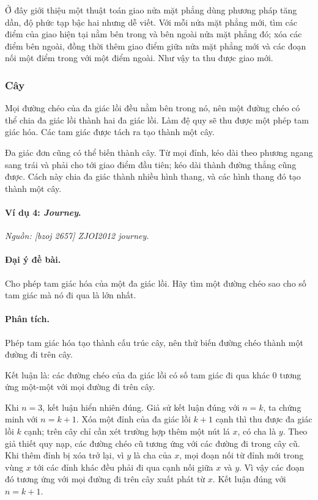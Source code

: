 \documentclass[11pt]{article}
\begin{document}
Ở đây giới thiệu một thuật toán giao nửa mặt phẳng dùng phương pháp tăng dần,
độ phức tạp bậc hai nhưng dễ viết. Với mỗi nửa mặt phẳng mới, tìm các điểm của
giao hiện tại nằm bên trong và bên ngoài nửa mặt phẳng đó; xóa các điểm bên
ngoài, đồng thời thêm giao điểm giữa nửa mặt phẳng mới và các đoạn nối một điểm
trong với một điểm ngoài. Như vậy ta thu được giao mới.

\subsubsection{Cây}

Mọi đường chéo của đa giác lồi đều nằm bên trong nó, nên một đường chéo có thể
chia đa giác lồi thành hai đa giác lồi. Làm đệ quy sẽ thu được một phép tam giác
hóa. Các tam giác được tách ra tạo thành một cây.

Đa giác đơn cũng có thể biến thành cây. Từ mọi đỉnh, kéo dài theo phương ngang
sang trái và phải cho tới giao điểm đầu tiên; kéo dài thành đường thẳng cũng
được. Cách này chia đa giác thành nhiều hình thang, và các hình thang đó tạo
thành một cây.

\paragraph{Ví dụ 4: \emph{Journey}.}
\emph{Nguồn: [bzoj 2657] ZJOI2012 journey.}

\paragraph{Đại ý đề bài.}
Cho phép tam giác hóa của một đa giác lồi. Hãy tìm một đường chéo sao cho số
tam giác mà nó đi qua là lớn nhất.

\paragraph{Phân tích.}
Phép tam giác hóa tạo thành cấu trúc cây, nên thử biến đường chéo thành một
đường đi trên cây.

Kết luận là: các đường chéo của đa giác lồi có số tam giác đi qua khác \(0\)
tương ứng một-một với mọi đường đi trên cây.

Khi \(n=3\), kết luận hiển nhiên đúng. Giả sử kết luận đúng với \(n=k\), ta
chứng minh với \(n=k+1\). Xóa một đỉnh của đa giác lồi \(k+1\) cạnh thì thu
được đa giác lồi \(k\) cạnh; trên cây chỉ cần xét trường hợp thêm một nút lá
\(x\), có cha là \(y\). Theo giả thiết quy nạp, các đường chéo cũ tương ứng với
các đường đi trong cây cũ. Khi thêm đỉnh bị xóa trở lại, vì \(y\) là cha của
\(x\), mọi đoạn nối từ đỉnh mới trong vùng \(x\) tới các đỉnh khác đều phải đi
qua cạnh nối giữa \(x\) và \(y\). Vì vậy các đoạn đó tương ứng với mọi đường đi
trên cây xuất phát từ \(x\). Kết luận đúng với \(n=k+1\).
\end{document}
